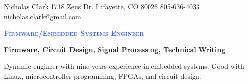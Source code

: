 \documentclass[letterpaper, 10pt]{article}
\newcommand{\NrcColorName}{Black}
\newcommand{\NrcColorTitle}{RoyalBlue}
\begin{document}
%
\nrctitle
{\textcolor{\NrcColorName}{Nicholas Clark}}
{1718 Zeus Dr.}
{Lafayette, CO 80026}
{805-636-4033}
{nicholas.clark@gmail.com}
%
\begin{center}\par\smallskip
\textcolor{\NrcColorTitle}{\Large \textbf{\textsc{Firmware/Embedded Systems Engineer}}}\par
\large \textbf{{Firmware, Circuit Design, Signal Processing, Technical Writing}}\par
\smallskip
\noindent \begin{minipage}[t]{0.75\textwidth}%
\begin{center}
Dynamic engineer with nine years experience in embedded systems. Good with Linux,
microcontroller programming, FPGAs, and circuit design.
\end{center}
\end{minipage}
\end{center}
\par \smallskip \smallskip
%
%
\end{document}
